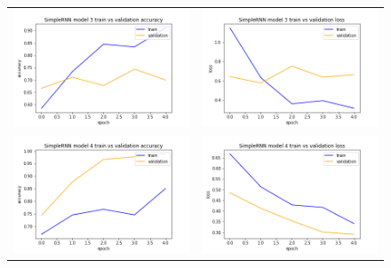 \begin{figure}
\begin{tabular}{cc}
\includegraphics[width=6.5cm]{images/classifier/model-output-simple-rnn-339/model-3-train-vs-validation-accuracy}&
\includegraphics[width=6.5cm]{images/classifier/model-output-simple-rnn-339/model-3-train-vs-validation-loss}\\

\includegraphics[width=6.5cm]{images/classifier/model-output-simple-rnn-339/model-4-train-vs-validation-accuracy}&
\includegraphics[width=6.5cm]{images/classifier/model-output-simple-rnn-339/model-4-train-vs-validation-loss}\\


\end{tabular}
\end{figure}
